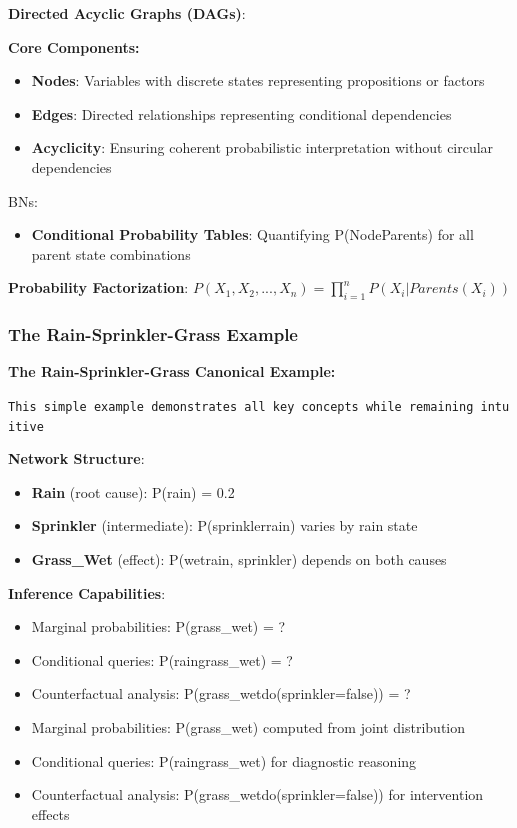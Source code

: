 \documentclass[
  11pt,
  letterpaper,
]{book}
\providecommand{\tightlist}{%
  \setlength{\itemsep}{0pt}\setlength{\parskip}{0pt}}
\begin{document}
\textbf{Directed Acyclic Graphs (DAGs)}:

\textbf{Core Components:}

\begin{itemize}
\tightlist
\item
  \textbf{Nodes}: Variables with discrete states representing
  propositions or factors
\item
  \textbf{Edges}: Directed relationships representing conditional
  dependencies
\item
  \textbf{Acyclicity}: Ensuring coherent probabilistic interpretation
  without circular dependencies
\end{itemize}

BNs:

\begin{itemize}
\tightlist
\item
  \textbf{Conditional Probability Tables}: Quantifying
  P(Node\textbar Parents) for all parent state combinations
\end{itemize}

\textbf{Probability Factorization}:
\(P(X_1, X_2, ..., X_n) = \prod_{i=1}^{n} P(X_i | Parents(X_i))\)

\subsubsection{The Rain-Sprinkler-Grass
Example}\label{sec-rain-sprinkler-example}

\textbf{The Rain-Sprinkler-Grass Canonical Example:}

\texttt{This\ simple\ example\ demonstrates\ all\ key\ concepts\ while\ remaining\ intuitive}

\textbf{Network Structure}:

\begin{itemize}
\tightlist
\item
  \textbf{Rain} (root cause): P(rain) = 0.2
\item
  \textbf{Sprinkler} (intermediate): P(sprinkler\textbar rain) varies by
  rain state
\item
  \textbf{Grass\_Wet} (effect): P(wet\textbar rain, sprinkler) depends
  on both causes
\end{itemize}

\textbf{Inference Capabilities}:

\begin{itemize}
\item
  Marginal probabilities: P(grass\_wet) = ?
\item
  Conditional queries: P(rain\textbar grass\_wet) = ?
\item
  Counterfactual analysis: P(grass\_wet\textbar do(sprinkler=false)) = ?
\item
  Marginal probabilities: P(grass\_wet) computed from joint distribution
\item
  Conditional queries: P(rain\textbar grass\_wet) for diagnostic
  reasoning
\item
  Counterfactual analysis: P(grass\_wet\textbar do(sprinkler=false)) for
  intervention effects
\end{itemize}
\end{document}
